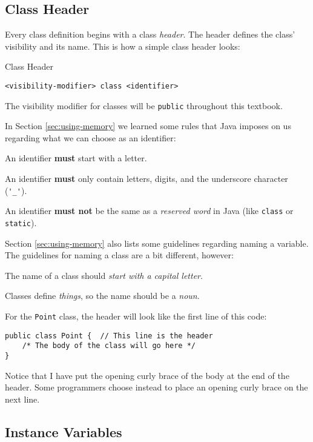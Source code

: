 \subsection{Class Header}

Every class definition begins with a class \textit{header}.  The header defines the class' visibility and its name.  This is how a simple class header looks:

\begin{javaformat}{Class Header}
\begin{verbatim}
<visibility-modifier> class <identifier>
\end{verbatim}
\end{javaformat}

The visibility modifier for classes will be \texttt{public} throughout this textbook.

In Section \ref{sec:using-memory} we learned some rules that Java imposes on us regarding what we can choose as an identifier:
\bi
\item An identifier \textbf{must} start with a letter.
\item An identifier \textbf{must} only contain letters, digits, and the underscore character (\verb-'_'-).
\item An identifier \textbf{must not} be the same as a \textit{reserved word} in Java (like \texttt{class} or \texttt{static}).
\ei

Section \ref{sec:using-memory} also lists some guidelines regarding naming a variable.  The guidelines for naming a class are a bit different, however:
\bi
\item The name of a class should \textit{start with a capital letter}.
\item Classes define \textit{things}, so the name should be a \textit{noun}.
\ei

For the \texttt{Point} class, the header will look like the first line of this code:

\begin{verbatim}
public class Point {  // This line is the header
    /* The body of the class will go here */
}
\end{verbatim}

Notice that I have put the opening curly brace of the body at the end of the header.  Some programmers choose instead to place an opening curly brace on the next line.

\subsection{Instance Variables}

